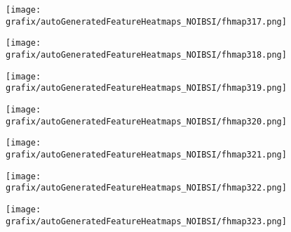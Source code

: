 \begin{subfigure}{\wid\textwidth} 
    \centering 
    \caption{\tiny \sffamily {}} 
    \vspace{\vsp} 
    \texttt{[image: grafix/autoGeneratedFeatureHeatmaps\_NOIBSI/fhmap317.png]} 
\end{subfigure} 
\hspace{\hsp} 
\begin{subfigure}{\wid\textwidth} 
    \centering 
    \caption{\tiny \sffamily {}} 
    \vspace{\vsp} 
    \texttt{[image: grafix/autoGeneratedFeatureHeatmaps\_NOIBSI/fhmap318.png]} 
\end{subfigure} 
\hspace{\hsp} 
\begin{subfigure}{\wid\textwidth} 
    \centering 
    \caption{\tiny \sffamily {}} 
    \vspace{\vsp} 
    \texttt{[image: grafix/autoGeneratedFeatureHeatmaps\_NOIBSI/fhmap319.png]} 
\end{subfigure} 
\hspace{\hsp} 
\begin{subfigure}{\wid\textwidth} 
    \centering 
    \caption{\tiny \sffamily {}} 
    \vspace{\vsp} 
    \texttt{[image: grafix/autoGeneratedFeatureHeatmaps\_NOIBSI/fhmap320.png]} 
\end{subfigure} 
\hspace{\hsp} 
\begin{subfigure}{\wid\textwidth} 
    \centering 
    \caption{\tiny \sffamily {}} 
    \vspace{\vsp} 
    \texttt{[image: grafix/autoGeneratedFeatureHeatmaps\_NOIBSI/fhmap321.png]} 
\end{subfigure} 
\hspace{\hsp} 
\begin{subfigure}{\wid\textwidth} 
    \centering 
    \caption{\tiny \sffamily {}} 
    \vspace{\vsp} 
    \texttt{[image: grafix/autoGeneratedFeatureHeatmaps\_NOIBSI/fhmap322.png]} 
\end{subfigure} 
\hspace{\hsp} 
\begin{subfigure}{\wid\textwidth} 
    \centering 
    \caption{\tiny \sffamily {}} 
    \vspace{\vsp} 
    \texttt{[image: grafix/autoGeneratedFeatureHeatmaps\_NOIBSI/fhmap323.png]} 
\end{subfigure} 
